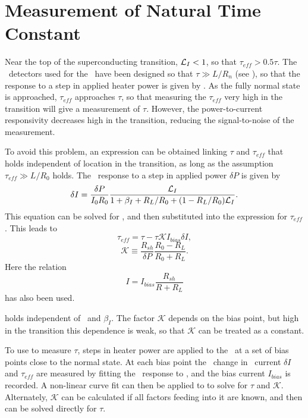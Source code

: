 \section{Measurement of Natural Time Constant}\label{sec:tau-nat-theory}

Near the top of the superconducting transition, $\mathcal{L}_I < 1$, so that $\tau_{eff} > 0.5 \tau$.
The \TES\ detectors used for the \Imager\ have been designed so that $\tau \gg L/R_n$ (see ), so that the response to a step in applied heater power is given by .
As the fully normal state is approached, $\tau_{eff}$ approaches $\tau$, so that measuring the $\tau_{eff}$ very high in the transition will give a measurement of $\tau$.
However, the power-to-current responsivity decreases high in the transition, reducing the signal-to-noise of the measurement.

To avoid this problem, an expression can be obtained linking $\tau$ and $\tau_{eff}$ that holds independent of location in the transition, as long as the assumption $\tau_{eff} \gg L/R_0$ holds.
The \DC\ response to a step in applied power $\delta P$ is given by
\begin{equation}
\delta I = \frac{\delta P}{I_0 R_0}\frac{\mathcal{L}_I}{1 + \beta_I + R_L/R_0 + (1 - R_L / R_0)\mathcal{L}_I}.
\end{equation}
This equation can be solved for \Loop, and then substituted into the expression for $\tau_{eff}$.
This leads to
\begin{equation}\label{eqn:teff-from-tau}
\tau_{eff} = \tau - \tau \mathcal{K} I_{bias} \delta I,
\end{equation}
\begin{equation}
\mathcal{K} \equiv \frac{R_{sh}}{\delta P} \frac{R_0 - R_L}{R_0 + R_L}.
\end{equation}
Here the relation
\begin{equation}
I = I_{bias}\frac{R_{sh}}{R + R_L}
\end{equation}
has also been used.

 holds independent of \Loop\ and $\beta_I$.
The factor $\mathcal{K}$ depends on the bias point, but high in the transition this dependence is weak, so that $\mathcal{K}$ can be treated as a constant.

To use  to measure $\tau$, steps in heater power are applied to the \TES\ at a set of bias points close to the normal state.
At each bias point the \DC\ change in \TES\ current $\delta I$ and $\tau_{eff}$ are measured by fitting the \TES\ response to , and the bias current $I_{bias}$ is recorded.
A non-linear curve fit can then be applied to  to solve for $\tau$ and $\mathcal{K}$.
Alternately, $\mathcal{K}$ can be calculated if all factors feeding into it are known, and then  can be solved directly for $\tau$.

